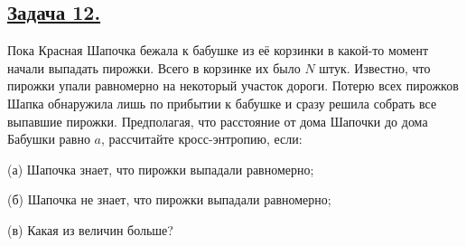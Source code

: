 \subsection*{\hyperref[sec:sol_problem12]{Задача 12.}}\label{sec:problem12} Пока Красная Шапочка бежала к бабушке из её корзинки в какой-то момент начали выпадать пирожки. Всего в корзинке их было $N$ штук. Известно, что пирожки упали равномерно на некоторый участок дороги. Потерю всех пирожков Шапка обнаружила лишь по прибытии к бабушке и сразу решила собрать все выпавшие пирожки. Предполагая, что расстояние от дома Шапочки до дома Бабушки равно $a$, рассчитайте кросс-энтропию, если:

(а) Шапочка знает, что пирожки выпадали равномерно;

(б) Шапочка не знает, что пирожки выпадали равномерно;

(в) Какая из величин больше?
